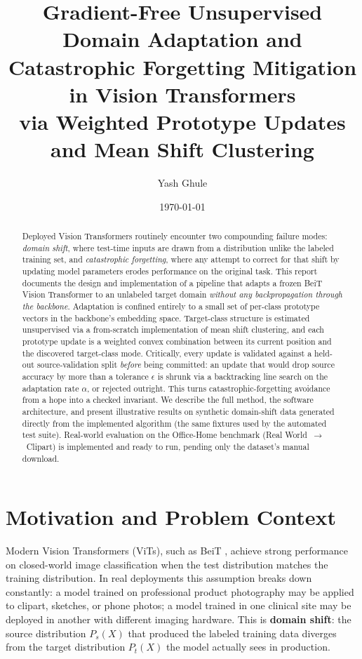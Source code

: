 \documentclass[11pt]{article}
\title{\textbf{Gradient-Free Unsupervised Domain Adaptation and \\
Catastrophic Forgetting Mitigation in Vision Transformers} \\[4pt]
\large via Weighted Prototype Updates and Mean Shift Clustering}
\author{Yash Ghule}
\date{\today}
\begin{document}
\maketitle

\begin{abstract}
Deployed Vision Transformers routinely encounter two compounding failure modes: \emph{domain
shift}, where test-time inputs are drawn from a distribution unlike the labeled training set,
and \emph{catastrophic forgetting}, where any attempt to correct for that shift by updating
model parameters erodes performance on the original task. This report documents the design and
implementation of a pipeline that adapts a frozen BeiT Vision Transformer to an unlabeled target
domain \emph{without any backpropagation through the backbone}. Adaptation is confined entirely
to a small set of per-class prototype vectors in the backbone's embedding space. Target-class
structure is estimated unsupervised via a from-scratch implementation of mean shift clustering,
and each prototype update is a weighted convex combination between its current position and the
discovered target-class mode. Critically, every update is validated against a held-out
source-validation split \emph{before} being committed: an update that would drop source accuracy
by more than a tolerance $\epsilon$ is shrunk via a backtracking line search on the adaptation
rate $\alpha$, or rejected outright. This turns catastrophic-forgetting avoidance from a hope
into a checked invariant. We describe the full method, the software architecture, and present
illustrative results on synthetic domain-shift data generated directly from the implemented
algorithm (the same fixtures used by the automated test suite). Real-world evaluation on the
Office-Home benchmark (Real World~$\to$~Clipart) is implemented and ready to run, pending only
the dataset's manual download.
\end{abstract}

\tableofcontents

\section{Motivation and Problem Context}

Modern Vision Transformers (ViTs), such as BeiT \cite{bao2022beit}, achieve strong performance
on closed-world image classification when the test distribution matches the training
distribution. In real deployments this assumption breaks down constantly: a model trained on
professional product photography may be applied to clipart, sketches, or phone photos; a model
trained in one clinical site may be deployed in another with different imaging hardware. This is
\textbf{domain shift}: the source distribution $P_s(X)$ that produced the labeled training data
diverges from the target distribution $P_t(X)$ the model actually sees in production.
\end{document}
